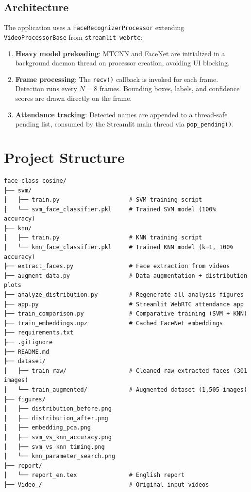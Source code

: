 \documentclass[12pt,a4paper]{article}
\begin{document}
\subsection{Architecture}
\label{subsec:architecture}

The application uses a \texttt{FaceRecognizerProcessor} extending \texttt{VideoProcessorBase} from \texttt{streamlit-webrtc}:
\begin{enumerate}
    \item \textbf{Heavy model preloading}: MTCNN and FaceNet are initialized in a background daemon thread on processor creation, avoiding UI blocking.
    \item \textbf{Frame processing}: The \texttt{recv()} callback is invoked for each frame. Detection runs every $N=8$ frames. Bounding boxes, labels, and confidence scores are drawn directly on the frame.
    \item \textbf{Attendance tracking}: Detected names are appended to a thread-safe pending list, consumed by the Streamlit main thread via \texttt{pop\_pending()}.
\end{enumerate}

\newpage

\section{Project Structure}
\label{sec:project_structure}

\begin{verbatim}
face-class-cosine/
├── svm/
│   ├── train.py                    # SVM training script
│   └── svm_face_classifier.pkl     # Trained SVM model (100% accuracy)
├── knn/
│   ├── train.py                    # KNN training script
│   └── knn_face_classifier.pkl     # Trained KNN model (k=1, 100% accuracy)
├── extract_faces.py                # Face extraction from videos
├── augment_data.py                 # Data augmentation + distribution plots
├── analyze_distribution.py         # Regenerate all analysis figures
├── app.py                          # Streamlit WebRTC attendance app
├── train_comparison.py             # Comparative training (SVM + KNN)
├── train_embeddings.npz            # Cached FaceNet embeddings
├── requirements.txt
├── .gitignore
├── README.md
├── dataset/
│   ├── train_raw/                  # Cleaned raw extracted faces (301 images)
│   └── train_augmented/            # Augmented dataset (1,505 images)
├── figures/
│   ├── distribution_before.png
│   ├── distribution_after.png
│   ├── embedding_pca.png
│   ├── svm_vs_knn_accuracy.png
│   ├── svm_vs_knn_timing.png
│   └── knn_parameter_search.png
├── report/
│   └── report_en.tex               # English report
├── Video_/                         # Original input videos
\end{verbatim}
\end{document}
